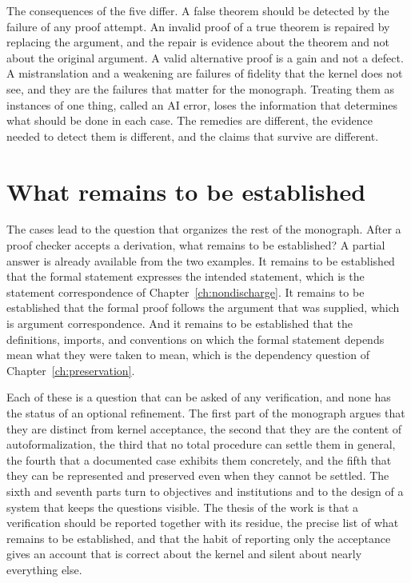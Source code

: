 The consequences of the five differ. A false theorem should be detected by the failure of any proof attempt. An invalid proof of a true theorem is repaired by replacing the argument, and the repair is evidence about the theorem and not about the original argument. A valid alternative proof is a gain and not a defect. A mistranslation and a weakening are failures of fidelity that the kernel does not see, and they are the failures that matter for the monograph. Treating them as instances of one thing, called an AI error, loses the information that determines what should be done in each case. The remedies are different, the evidence needed to detect them is different, and the claims that survive are different.

\section{What remains to be established}

The cases lead to the question that organizes the rest of the monograph. After a proof checker accepts a derivation, what remains to be established? A partial answer is already available from the two examples. It remains to be established that the formal statement expresses the intended statement, which is the statement correspondence of Chapter~\ref{ch:nondischarge}. It remains to be established that the formal proof follows the argument that was supplied, which is argument correspondence. And it remains to be established that the definitions, imports, and conventions on which the formal statement depends mean what they were taken to mean, which is the dependency question of Chapter~\ref{ch:preservation}.

Each of these is a question that can be asked of any verification, and none has the status of an optional refinement. The first part of the monograph argues that they are distinct from kernel acceptance, the second that they are the content of autoformalization, the third that no total procedure can settle them in general, the fourth that a documented case exhibits them concretely, and the fifth that they can be represented and preserved even when they cannot be settled. The sixth and seventh parts turn to objectives and institutions and to the design of a system that keeps the questions visible. The thesis of the work is that a verification should be reported together with its residue, the precise list of what remains to be established, and that the habit of reporting only the acceptance gives an account that is correct about the kernel and silent about nearly everything else.
